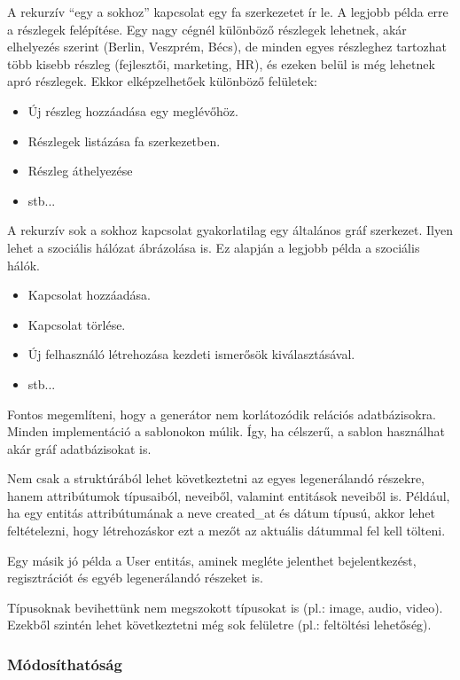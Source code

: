 \documentclass[a4paper,12pt,oneside]{report}
\begin{document}
\begin{justify}
	A rekurzív “egy a sokhoz” kapcsolat egy fa szerkezetet ír le. A legjobb példa erre a részlegek felépítése. Egy nagy cégnél különböző részlegek lehetnek, akár elhelyezés szerint (Berlin, Veszprém, Bécs), de minden egyes részleghez tartozhat több kisebb részleg (fejlesztői, marketing, HR), és ezeken belül is még lehetnek apró részlegek. Ekkor elképzelhetőek különböző felületek: 

	\begin{itemize}
		\item Új részleg hozzáadása egy meglévőhöz. 
		\item Részlegek listázása fa szerkezetben. 
		\item Részleg áthelyezése
		\item stb...
	\end{itemize}

    A rekurzív sok a sokhoz kapcsolat gyakorlatilag egy általános gráf szerkezet. Ilyen lehet a szociális hálózat ábrázolása is. Ez alapján a legjobb példa a szociális hálók. 
    \begin{itemize}
		\item Kapcsolat hozzáadása. 
		\item Kapcsolat törlése.
		\item Új felhasználó létrehozása kezdeti ismerősök kiválasztásával.
		\item stb...
	\end{itemize}

	Fontos megemlíteni, hogy a generátor nem korlátozódik relációs adatbázisokra. Minden implementáció a sablonokon múlik. Így, ha célszerű, a sablon használhat akár gráf adatbázisokat is.   

	Nem csak a struktúrából lehet következtetni az egyes legenerálandó részekre, hanem attribútumok típusaiból, neveiből, valamint entitások neveiből is. Például, ha egy entitás attribútumának a neve created\_at és dátum típusú, akkor lehet feltételezni, hogy létrehozáskor ezt a mezőt az aktuális dátummal fel kell tölteni. 

	Egy másik jó példa a User entitás, aminek megléte jelenthet bejelentkezést, regisztrációt és egyéb legenerálandó részeket is.

	Típusoknak bevihettünk nem megszokott típusokat is (pl.: image, audio, video). Ezekből szintén lehet következtetni még sok felületre (pl.: feltöltési lehetőség).

\end{justify}

\newpage
\subsubsection{Módosíthatóság}
\end{document}
